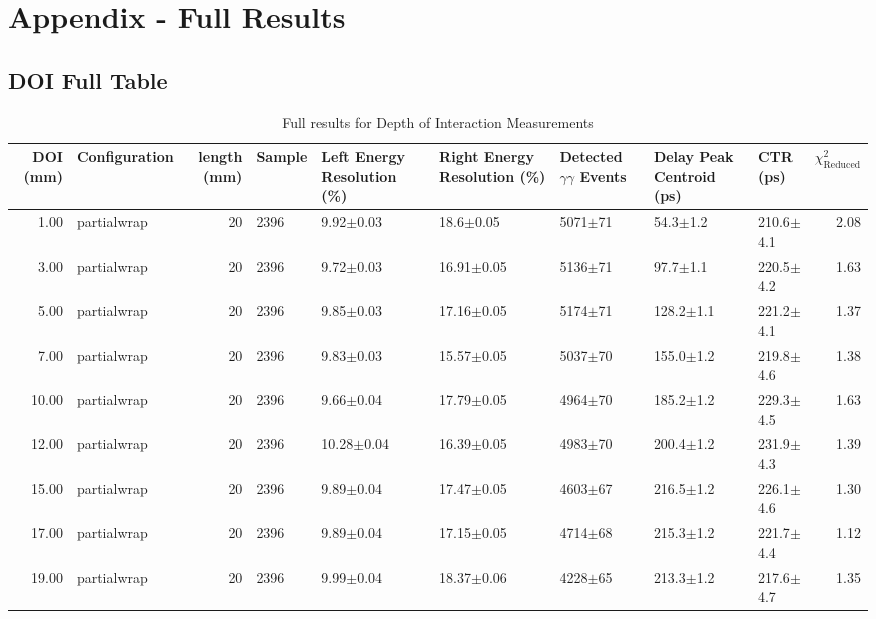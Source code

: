 \section*{Appendix - Full Results}

\subsection{DOI Full Table}
\label{app:fulldoi}
\begin{table}
\caption{\label{tab:FullDOIResults} Full results for Depth of Interaction Measurements}
\begin{tabular}{rlrllllllr}
\hline
DOI (mm) & Configuration &  length (mm) & Sample & Left Energy Resolution (\%) & Right Energy Resolution (\%) & Detected $\gamma\gamma$ Events & Delay Peak Centroid (ps) & CTR (ps) &  $\chi^2_\text{Reduced}$ \\
\hline
      1.00 &   partialwrap &      20 &    2396 &        9.92$\pm$0.03 &    18.6$\pm$0.05 &  5071$\pm$71 &    54.3$\pm$1.2 &   210.6$\pm$4.1 &        2.08 \\
      3.00 &   partialwrap &      20 &    2396 &        9.72$\pm$0.03 &   16.91$\pm$0.05 &  5136$\pm$71 &    97.7$\pm$1.1 &   220.5$\pm$4.2 &        1.63 \\
      5.00 &   partialwrap &      20 &    2396 &        9.85$\pm$0.03 &   17.16$\pm$0.05 &  5174$\pm$71 &   128.2$\pm$1.1 &   221.2$\pm$4.1 &        1.37 \\
      7.00 &   partialwrap &      20 &    2396 &        9.83$\pm$0.03 &   15.57$\pm$0.05 &  5037$\pm$70 &   155.0$\pm$1.2 &   219.8$\pm$4.6 &        1.38 \\
     10.00 &   partialwrap &      20 &    2396 &        9.66$\pm$0.04 &   17.79$\pm$0.05 &  4964$\pm$70 &   185.2$\pm$1.2 &   229.3$\pm$4.5 &        1.63 \\
     12.00 &   partialwrap &      20 &    2396 &       10.28$\pm$0.04 &   16.39$\pm$0.05 &  4983$\pm$70 &   200.4$\pm$1.2 &   231.9$\pm$4.3 &        1.39 \\
     15.00 &   partialwrap &      20 &    2396 &        9.89$\pm$0.04 &   17.47$\pm$0.05 &  4603$\pm$67 &   216.5$\pm$1.2 &   226.1$\pm$4.6 &        1.30 \\
     17.00 &   partialwrap &      20 &    2396 &        9.89$\pm$0.04 &   17.15$\pm$0.05 &  4714$\pm$68 &   215.3$\pm$1.2 &   221.7$\pm$4.4 &        1.12 \\
     19.00 &   partialwrap &      20 &    2396 &        9.99$\pm$0.04 &   18.37$\pm$0.06 &  4228$\pm$65 &   213.3$\pm$1.2 &   217.6$\pm$4.7 &        1.35 \\

\end{tabular}
\end{table}
